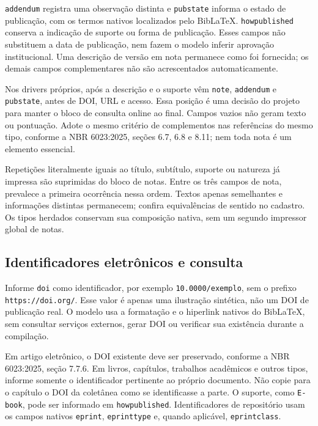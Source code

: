 \texttt{addendum} registra uma observação distinta e \texttt{pubstate} informa
o estado de publicação, com os termos nativos localizados pelo BibLaTeX.
\texttt{howpublished} conserva a indicação de suporte ou forma de publicação.
Esses campos não substituem a data de publicação, nem fazem o modelo inferir
aprovação institucional. Uma descrição de versão em nota permanece como foi
fornecida; os demais campos complementares não são acrescentados automaticamente.

Nos drivers próprios, após a descrição e o suporte vêm \texttt{note},
\texttt{addendum} e \texttt{pubstate}, antes de DOI, URL e acesso.
Essa posição é uma decisão do projeto para manter o bloco de consulta online
ao final. Campos vazios não geram texto ou pontuação. Adote o mesmo critério
de complementos nas referências do mesmo tipo, conforme a NBR 6023:2025,
seções 6.7, 6.8 e 8.11; nem toda nota é um elemento essencial.

Repetições literalmente iguais ao título, subtítulo, suporte ou natureza já
impressa são suprimidas do bloco de notas. Entre os três campos de nota,
prevalece a primeira ocorrência nessa ordem. Textos apenas semelhantes e
informações distintas permanecem; confira equivalências de sentido no cadastro.
Os tipos herdados conservam sua composição nativa, sem um segundo impressor
global de notas.

\subsection*{Identificadores eletrônicos e consulta}

Informe \texttt{doi} como identificador, por exemplo
\texttt{10.0000/exemplo}, sem o prefixo \texttt{https://doi.org/}.
Esse valor é apenas uma ilustração sintética, não um DOI de publicação real.
O modelo usa a formatação e o hiperlink nativos do BibLaTeX, sem consultar
serviços externos, gerar DOI ou verificar sua existência durante a compilação.

Em artigo eletrônico, o DOI existente deve ser preservado, conforme a NBR
6023:2025, seção 7.7.6. Em livros, capítulos, trabalhos acadêmicos e outros
tipos, informe somente o identificador pertinente ao próprio documento.
Não copie para o capítulo o DOI da coletânea como se identificasse a parte.
O suporte, como \texttt{E-book}, pode ser informado em \texttt{howpublished}.
Identificadores de repositório usam os campos nativos \texttt{eprint},
\texttt{eprinttype} e, quando aplicável, \texttt{eprintclass}.

